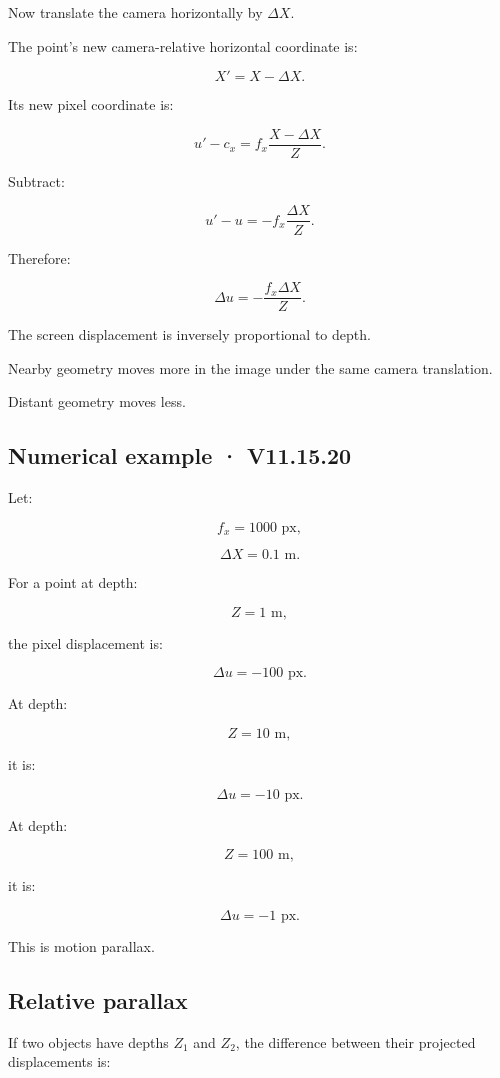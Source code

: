 Now translate the camera horizontally by \(\Delta X\).

The point's new camera-relative horizontal coordinate is:

\[ X'=X-\Delta X. \]

Its new pixel coordinate is:

\[ u'-c_x=f_x\frac{X-\Delta X}{Z}. \]

Subtract:

\[ u'-u=-f_x\frac{\Delta X}{Z}. \]

Therefore:

\[ \boxed{ \Delta u=-\frac{f_x\Delta X}{Z}. } \]

The screen displacement is inversely proportional to depth.

Nearby geometry moves more in the image under the same camera translation.

Distant geometry moves less.

\subsection{Numerical example · V11.15.20}\label{02-foundations-ii-ch035-numerical-example-v11.15.20}

Let:

\[ f_x=1000\text{ px}, \]

\[ \Delta X=0.1\text{ m}. \]

For a point at depth:

\[ Z=1\text{ m}, \]

the pixel displacement is:

\[ \boxed{\Delta u=-100\text{ px}}. \]

At depth:

\[ Z=10\text{ m}, \]

it is:

\[ \boxed{\Delta u=-10\text{ px}}. \]

At depth:

\[ Z=100\text{ m}, \]

it is:

\[ \boxed{\Delta u=-1\text{ px}}. \]

This is motion parallax.

\subsection{Relative parallax}\label{02-foundations-ii-ch035-relative-parallax}

If two objects have depths \(Z_1\) and \(Z_2\), the difference between their projected displacements is:

